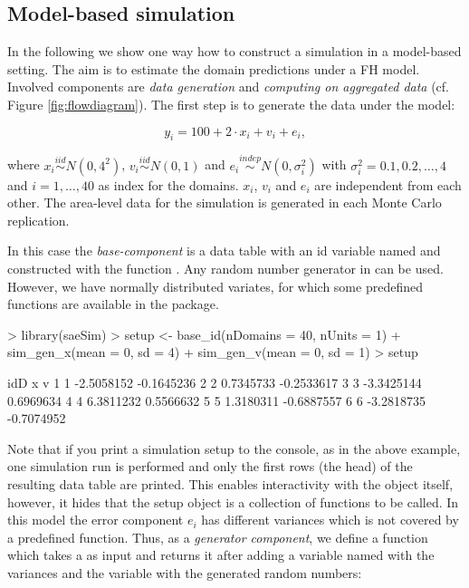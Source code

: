 \documentclass[article]{ajs}
\begin{document}
\subsection{Model-based simulation}
\label{sec:csModel}
In the following we show one way how to construct a simulation in a model-based setting. The aim is to estimate the domain predictions under a FH model. Involved components are \textit{data generation} and \textit{computing on aggregated data} (cf. Figure \ref{fig:flowdiagram}). The first step is to generate the data under the model:

\[ y_i = 100 + 2 \cdot x_i + v_i + e_i,\]

where $x_i \stackrel{iid}{\sim} N(0, 4^2)$, $v_i \stackrel{iid}{\sim} N(0, 1)$ and $e_i \stackrel{indep}{\sim} N(0, \sigma_i^2)$ with $\sigma_i^2 = 0.1, 0.2, \dots, 4$ and $i = 1, \dots, 40$ as index for the domains. $x_i$, $v_i$ and $e_i$ are independent from each other. The area-level data for the simulation is generated in each Monte Carlo replication. 

In this case the \textit{base-component} is a data table with an id variable named  and constructed with the function . Any random number generator in  can be used. However, we have normally distributed variates, for which some predefined functions are available in the package.

\begin{Schunk}
\begin{Sinput}
> library(saeSim)
> setup <- base_id(nDomains = 40, nUnits = 1) %
+   sim_gen_x(mean = 0, sd = 4) %
+   sim_gen_v(mean = 0, sd = 1)
> setup
\end{Sinput}
\begin{Soutput}
  idD          x          v
1   1 -2.5058152 -0.1645236
2   2  0.7345733 -0.2533617
3   3 -3.3425144  0.6969634
4   4  6.3811232  0.5566632
5   5  1.3180311 -0.6887557
6   6 -3.2818735 -0.7074952
\end{Soutput}
\end{Schunk}

Note that if you print a simulation setup to the console, as in the above example, one simulation run is performed and only the first rows (the head) of the resulting data table are printed. This enables interactivity with the object itself, however, it hides that the setup object is a collection of functions to be called. In this model the error component $e_i$ has different variances which is not covered by a predefined function. Thus, as a \textit{generator component}, we define a function which takes a  as input and returns it after adding a variable named  with the variances and the variable  with the generated random numbers:
\end{document}
